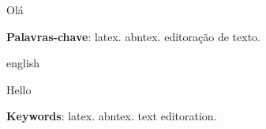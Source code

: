 \setlength{\absparsep}{18pt} %
\begin{resumo}


Olá

 \textbf{Palavras-chave}: latex. abntex. editoração de texto.
\end{resumo}

\begin{resumo}[Abstract]
 \begin{otherlanguage*}{english}

Hello

   \textbf{Keywords}: latex. abntex. text editoration.
 \end{otherlanguage*}
\end{resumo}